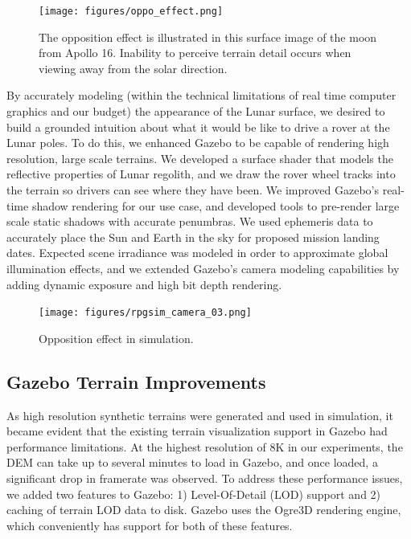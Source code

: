 \documentclass[twocolumn,letterpaper]{IEEEAerospaceCLS}  %
\begin{document}
\begin{figure}[h!]
  \texttt{[image: figures/oppo\_effect.png]}
    \caption{The opposition effect is illustrated in this surface image of the moon from Apollo 16.  Inability to perceive terrain detail occurs when viewing away from the solar direction.}
    \label{fig:oppo_effect}
\end{figure}

By accurately modeling (within the technical limitations of real time computer graphics and our budget) the appearance of the Lunar surface, we desired to build a grounded intuition about what it would be like to drive a rover at the Lunar poles.  
To do this, we enhanced Gazebo to be capable of rendering high resolution, large scale terrains.  
We developed a surface shader that models the reflective properties of Lunar regolith, and we draw the rover wheel tracks into the terrain so drivers can see where they have been.  
We improved Gazebo's real-time shadow rendering for our use case, and developed tools to pre-render large scale static shadows with accurate penumbras.  
We used ephemeris data to accurately place the Sun and Earth in the sky for proposed mission landing dates.  
Expected scene irradiance was modeled in order to approximate global illumination effects, and we extended Gazebo's camera modeling capabilities by adding dynamic exposure and high bit depth rendering.  

\begin{figure}[h!]
  \texttt{[image: figures/rpgsim\_camera\_03.png]}
  \caption{Opposition effect in simulation.}
  \label{fig:opposition_in_sim}
\end{figure}

\subsection{Gazebo Terrain Improvements}

As high resolution synthetic terrains were generated and used in simulation, it became evident that the existing terrain visualization support in Gazebo had performance limitations.  
At the highest resolution of 8K in our experiments, the DEM can take up to several minutes to load in Gazebo, and once loaded, a significant drop in framerate was observed.  
To address these performance issues, we added two features to Gazebo: 1) Level-Of-Detail (LOD) support and 2) caching of terrain LOD data to disk.
Gazebo uses the Ogre3D rendering engine, which conveniently has support for both of these features.  
\end{document}
